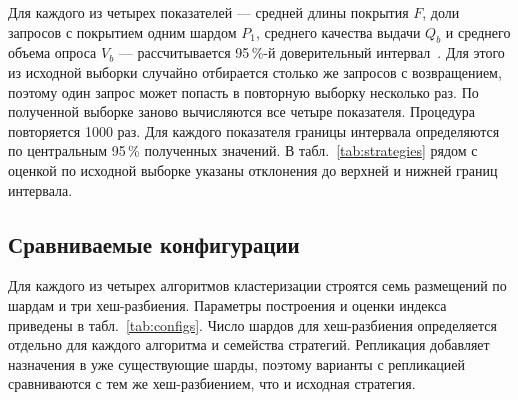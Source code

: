 \documentclass[10pt, a4paper, twoside]{article}
\begin{document}
\begin{ntvbody}
Для каждого из четырех показателей --- средней длины покрытия $F$, доли запросов с покрытием одним шардом $P_1$, среднего качества выдачи $Q_b$ и среднего объема опроса $V_b$ --- рассчитывается 95\,\%-й доверительный интервал~\cite{efron1994}.
Для этого из исходной выборки случайно отбирается столько же запросов с возвращением, поэтому один запрос может попасть в повторную выборку несколько раз.
По полученной выборке заново вычисляются все четыре показателя.
Процедура повторяется 1000 раз.
Для каждого показателя границы интервала определяются по центральным 95\,\% полученных значений.
В табл.~\ref{tab:strategies} рядом с оценкой по исходной выборке указаны отклонения до верхней и нижней границ интервала.

\subsection{Сравниваемые конфигурации}
Для каждого из четырех алгоритмов кластеризации строятся семь размещений по шардам и три хеш-разбиения.
Параметры построения и оценки индекса приведены в табл.~\ref{tab:configs}.
Число шардов для хеш-разбиения определяется отдельно для каждого алгоритма и семейства стратегий.
Репликация добавляет назначения в уже существующие шарды, поэтому варианты с репликацией сравниваются с тем же хеш-разбиением, что и исходная стратегия.

\end{ntvbody}
\end{document}
